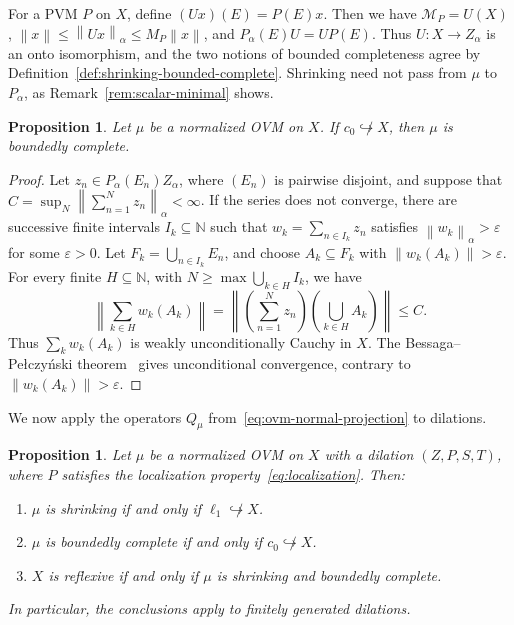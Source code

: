 \documentclass[11pt,leqno]{amsart}
\theoremstyle{compact}
\numberwithin{equation}{section}
\newtheorem{proposition}[theorem]{Proposition}
\theoremstyle{compactremark}
\theoremstyle{compact}
\newcommand{\1}{\mathbbm{1}}
\newcommand{\N}{\mathbb{N}}
\newcommand{\norm}[1]{\left\|#1\right\|}
\begin{document}
For a PVM $P$ on $X$, define $(Ux)(E)=P(E)x$. Then we have $\mathcal M_P=U(X)$, $\norm{x}\leq\norm{Ux}_\alpha\leq M_P\norm{x}$, and $P_\alpha(E)U=UP(E). $ Thus $U\colon X\to Z_\alpha$ is an onto isomorphism, and the two notions of bounded completeness agree by Definition~\ref{def:shrinking-bounded-complete}. Shrinking need not pass from $\mu$ to $P_\alpha$, as Remark~\ref{rem:scalar-minimal} shows.

\begin{proposition}\label{prop:minimal-bounded-complete}
Let $\mu$ be a normalized OVM on $X$. If $c_0\not\hookrightarrow X$, then $\mu$ is boundedly complete.
\end{proposition}

\begin{proof}
Let $z_n\in P_\alpha(E_n)Z_\alpha$, where $(E_n)$ is pairwise disjoint, and suppose that $C=\sup_N\norm{\sum_{n=1}^Nz_n}_\alpha<\infty$. If the series does not converge, there are successive finite intervals $I_k\subseteq\N$ such that $w_k=\sum_{n\in I_k}z_n$ satisfies $\norm{w_k}_\alpha>\varepsilon$ for some $\varepsilon>0$. Let $F_k=\bigcup_{n\in I_k}E_n$, and choose $A_k\subseteq F_k$ with $\norm{w_k(A_k)}>\varepsilon$. For every finite $H\subseteq\N$, with $N\geq\max\bigcup_{k\in H}I_k$, we have
\[
\norm{\sum_{k\in H}w_k(A_k)}
=\norm{\left(\sum_{n=1}^Nz_n\right)\left(\bigcup_{k\in H}A_k\right)}
\leq C.
\]
Thus $\sum_kw_k(A_k)$ is weakly unconditionally Cauchy in $X$. The Bessaga--Pe\l czy\'nski theorem~\cite{BessagaPelczynski1958} gives unconditional convergence, contrary to $\norm{w_k(A_k)}>\varepsilon$.
\end{proof}
\endgroup

We now apply the operators $Q_\mu$ from~\eqref{eq:ovm-normal-projection} to dilations.

\begingroup
\begin{proposition}\label{prop:ovm-normal}
Let $\mu$ be a normalized OVM on $X$ with a dilation $(Z,P,S,T)$, where $P$ satisfies the localization property~\eqref{eq:localization}. Then:
\begin{enumerate}
\item $\mu$ is shrinking if and only if $\ell_1\not\hookrightarrow X$.
\item $\mu$ is boundedly complete if and only if $c_0\not\hookrightarrow X$.
\item $X$ is reflexive if and only if $\mu$ is shrinking and boundedly complete.
\end{enumerate}
In particular, the conclusions apply to finitely generated dilations.
\end{proposition}
\end{document}
